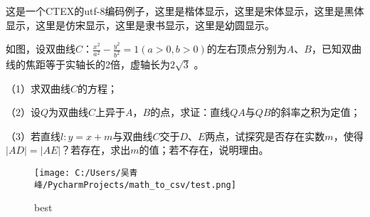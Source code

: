 \documentclass[UTF8]{article}
\begin{document}
这是一个CTEX的utf-8编码例子，{\kaishu 这里是楷体显示}，{\songti 这里是宋体显示}，{\heiti 这里是黑体显示}，{\fangsong 这里是仿宋显示}，{\lishu 这里是隶书显示}，{\youyuan 这里是幼圆显示}。

如图，设双曲线$C$：$\frac{x^2}{a^2}-\frac{y^2}{b^2}=1(a>0,b>0)$的左右顶点分别为$A$、$B$，已知双曲线的焦距等于实轴长的2倍，虚轴长为$2\sqrt{3}$ 。

（1）求双曲线$C$的方程；

（2）设$Q$为双曲线$C$上异于$A$，$B$的点，求证：直线$QA$与$QB$的斜率之积为定值；

（3）若直线$l:y=x+m$与双曲线$C$交于$D$、$E$两点，试探究是否存在实数$m$，使得$|AD|=|AE|$？若存在，求出$m$的值；若不存在，说明理由。

\begin{figure}[H]
  \centering
  \texttt{[image: C:/Users/吴青峰/PycharmProjects/math\_to\_csv/test.png]} %
  \caption{best} %
 \end{figure}
 
\end{document}
